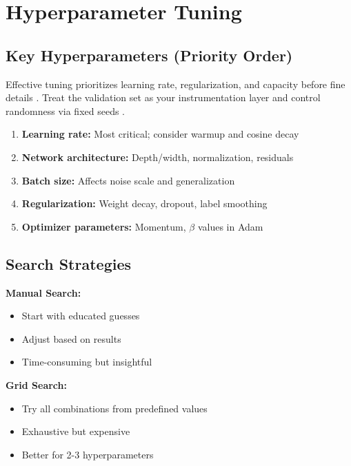 
\section{Hyperparameter Tuning }
\label{sec:hyperparameter-tuning}

\subsection{Key Hyperparameters (Priority Order)}

Effective tuning prioritizes learning rate, regularization, and capacity before fine details . Treat the validation set as your instrumentation layer and control randomness via fixed seeds \textcite{GoodfellowEtAl2016,Prince2023,D2LChapterOptimization}.

\begin{enumerate}
    \item \textbf{Learning rate:} Most critical; consider warmup and cosine decay
    \item \textbf{Network architecture:} Depth/width, normalization, residuals
    \item \textbf{Batch size:} Affects noise scale and generalization
    \item \textbf{Regularization:} Weight decay, dropout, label smoothing
    \item \textbf{Optimizer parameters:} Momentum, $\beta$ values in Adam
\end{enumerate}

\subsection{Search Strategies}

\textbf{Manual Search:}
\begin{itemize}
    \item Start with educated guesses
    \item Adjust based on results
    \item Time-consuming but insightful
\end{itemize}

\textbf{Grid Search:}
\begin{itemize}
    \item Try all combinations from predefined values
    \item Exhaustive but expensive
    \item Better for 2-3 hyperparameters
\end{itemize}

